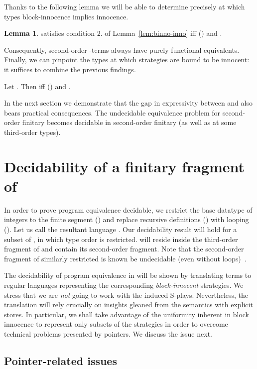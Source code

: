 \documentclass{CSML}
\theoremstyle{definition}\newtheorem{definition}[thm]{Definition}
\theoremstyle{definition}\newtheorem{example}[thm]{Example}
\theoremstyle{definition}\newtheorem{proposition}[thm]{Proposition}
\theoremstyle{definition}\newtheorem{lemma}[thm]{Lemma}
\theoremstyle{definition}\newtheorem{theorem}[thm]{Theorem}
\theoremstyle{definition}\newtheorem{corollary}[thm]{Corollary}
\theoremstyle{definition}\newtheorem{remark}[thm]{Remark}
\begin{document}
\noindent Thanks to the following lemma we will be able to determine precisely at which 
types  block-innocence implies innocence.
\begin{lemma}
 satisfies condition 2.
of Lemma~\ref{lem:binno-inno} iff  ()
and .
\end{lemma}
Consequently, second-order -terms always have
purely functional equivalents.
Finally, we can pinpoint the types at which strategies are bound to be innocent:
it suffices to combine the previous findings.
\begin{thm}
Let . Then 
 iff  () and .
\end{thm}
In the next section we demonstrate that the gap in expressivity between 
and  also bears practical consequences.  The undecidable equivalence
problem for second-order finitary  becomes decidable in second-order finitary 
(as well as at some third-order types).





\section{Decidability of a finitary fragment of \texorpdfstring{}{IAcbv}}

In order to prove program equivalence decidable, we restrict the base
datatype of integers to the finite segment  ()
and replace recursive definitions () with looping ().
Let us call the resultant language .
Our decidability result will hold for a subset  of , in which
type order is restricted.  will reside inside the third-order fragment of 
and contain its second-order fragment. Note that the second-order fragment of 
similarly restricted  is known be undecidable (even without loops)~\cite{Mur04b}.

The decidability of program equivalence in  will be shown by translating terms
to regular languages representing the corresponding \emph{block-innocent} strategies.
We stress that we are \emph{not} going to work with the induced S-plays.
Nevertheless, the translation will rely crucially on insights
gleaned from the semantics with explicit stores. In particular, we shall take advantage of the uniformity inherent in block innocence
to represent only subsets of the strategies in order to overcome technical problems presented by pointers.
We discuss the issue next.

\subsection{Pointer-related issues}
\end{document}
